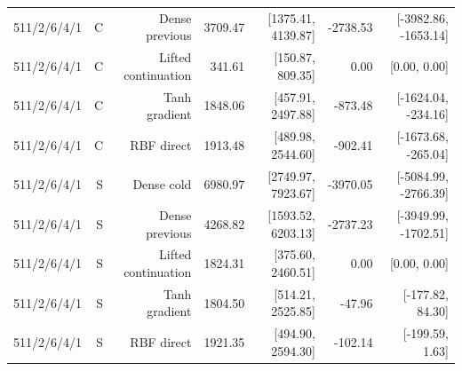 \begin{table}[tbp]
\begin{tabular}{lrrrrrr}
511/2/6/4/1 & C & Dense previous & 3709.47 & [1375.41, 4139.87] & -2738.53 & [-3982.86, -1653.14]\\
511/2/6/4/1 & C & Lifted continuation & 341.61 & [150.87, 809.35] & 0.00 & [0.00, 0.00]\\
511/2/6/4/1 & C & Tanh gradient & 1848.06 & [457.91, 2497.88] & -873.48 & [-1624.04, -234.16]\\
511/2/6/4/1 & C & RBF direct & 1913.48 & [489.98, 2544.60] & -902.41 & [-1673.68, -265.04]\\
511/2/6/4/1 & S & Dense cold & 6980.97 & [2749.97, 7923.67] & -3970.05 & [-5084.99, -2766.39]\\
511/2/6/4/1 & S & Dense previous & 4268.82 & [1593.52, 6203.13] & -2737.23 & [-3949.99, -1702.51]\\
511/2/6/4/1 & S & Lifted continuation & 1824.31 & [375.60, 2460.51] & 0.00 & [0.00, 0.00]\\
511/2/6/4/1 & S & Tanh gradient & 1804.50 & [514.21, 2525.85] & -47.96 & [-177.82, 84.30]\\
511/2/6/4/1 & S & RBF direct & 1921.35 & [494.90, 2594.30] & -102.14 & [-199.59, 1.63]\\
\bottomrule
\end{tabular}
\end{table}

